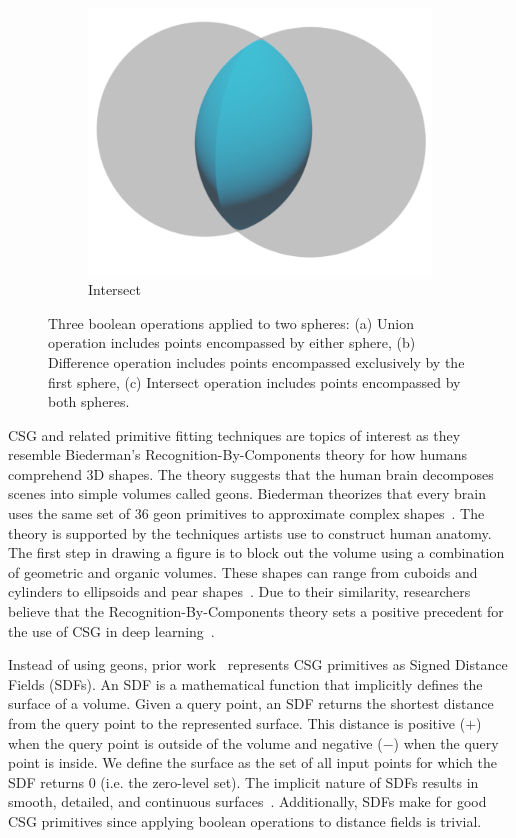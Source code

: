 \begin{figure}
\begin{subfigure}[t]{0.3\textwidth}
		\includegraphics[width=\textwidth]{Images/Intersect}
		\caption{Intersect}
	\end{subfigure}
	\caption{Three boolean operations applied to two spheres: (a) Union operation includes points encompassed by either sphere, (b) Difference operation includes points encompassed exclusively by the first sphere, (c) Intersect operation includes points encompassed by both spheres.}
	\label{fig:boolean operations}
\end{figure}

CSG and related primitive fitting techniques are topics of interest as they resemble Biederman's Recognition-By-Components theory for how humans comprehend 3D shapes. The theory suggests that the human brain decomposes scenes into simple volumes called geons. Biederman theorizes that every brain uses the same set of 36 geon primitives to approximate complex shapes~\cite{Biederman1987}. The theory is supported by the techniques artists use to construct human anatomy. The first step in drawing a figure is to block out the volume using a combination of geometric and organic volumes. These shapes can range from cuboids and cylinders to ellipsoids and pear shapes~\cite{Winslow2015}. Due to their similarity, researchers believe that the Recognition-By-Components theory sets a positive precedent for the use of CSG in deep learning~\cite{Sharma2018}.

Instead of using geons, prior work~\cite{Sharma2018, Kania2020, Ren2021} represents CSG primitives as Signed Distance Fields (SDFs). An SDF is a mathematical function that implicitly defines the surface of a volume. Given a query point, an SDF returns the shortest distance from the query point to the represented surface. This distance is positive ($+$) when the query point is outside of the volume and negative ($-$) when the query point is inside. We define the surface as the set of all input points for which the SDF returns 0 (i.e. the zero-level set). The implicit nature of SDFs results in smooth, detailed, and continuous surfaces~\cite{Park2019}. Additionally, SDFs make for good CSG primitives since applying boolean operations to distance fields is trivial.

